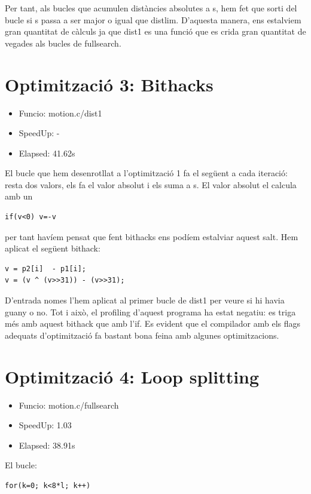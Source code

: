 Per tant, als bucles que acumulen distàncies absolutes a s, hem fet que sorti del bucle si s passa a ser major o igual que distlim. D'aquesta manera, ens estalviem gran quantitat de càlculs ja que dist1 es una funció que es crida gran quantitat de vegades als bucles de fullsearch.

\section{Optimitzaci\'o 3: Bithacks}
\begin{itemize}
\item{Funcio: motion.c/dist1}
\item{SpeedUp: -}
\item{Elapsed: 41.62s}
\end{itemize}

El bucle que hem desenrotllat a l'optimització 1 fa el següent a cada iteració: resta dos valors, els fa el valor absolut i els suma a s. El valor absolut el calcula amb un 

\begin{lstlisting}
if(v<0) v=-v 
\end{lstlisting}

per tant havíem pensat que fent bithacks ens podíem estalviar aquest salt. Hem aplicat el següent bithack:

\begin{lstlisting}
v = p2[i]  - p1[i];
v = (v ^ (v>>31)) - (v>>31);
\end{lstlisting}
 

D'entrada nomes l'hem aplicat al primer bucle de dist1 per veure si hi havia guany o no. Tot i això, el profiling d'aquest programa ha estat negatiu: es triga més amb aquest bithack que amb l'if. Es evident que el compilador amb els flags adequats d'optimització fa bastant bona feina amb algunes optimitzacions.
              

\section{Optimitzaci\'o 4: Loop splitting}
\begin{itemize}
\item{Funcio: motion.c/fullsearch}
\item{SpeedUp: 1.03}
\item {Elapsed: 38.91s}
\end{itemize}

El bucle:

\begin{lstlisting}
for(k=0; k<8*l; k++)
\end{lstlisting}

